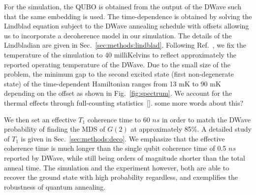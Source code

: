 \documentclass[prd,twocolumn,tightenlines,preprintnumbers,showpacs,superscriptaddress,notitlepage,nofootinbib,eqsecnum,floatfix,longbibliography]{revtex4}
\begin{document}
For the simulation, the QUBO is obtained from the output of the DWave such that the same embedding is used. The time-dependence is obtained by solving the Lindblad equation subject to the DWave annealing schedule with offsets allowing us to incorporate a decoherence model in our simulation. The details of the Lindbladian are given in Sec.~\ref{sec:methods:lindblad}. Following Ref.~\cite{}, we fix the temperature of the simulation to 40 milliKelvins to reflect approximately the reported operating temperature of the DWave. Due to the small size of the problem, the minimum gap to the second excited state (first non-degenerate state) of the time-dependent Hamiltonian ranges from 13 mK to 90 mK depending on the offset as shown in Fig.~\ref{fig:spectrum}. We account for the thermal effects through full-counting statistics~\ref{}. {\color{red}some more words about this?}

We then set an effective $T_1$ coherence time to 60 $ns$ in order to match the DWave probability of finding the MDS of $G(2)$ at approximately 85\%. A detailed study of $T_1$ is given in Sec.~\ref{sec:methods:deco}. We emphasize that the effective coherence time is much longer than the single qubit coherence time of 0.5 $ns$ reported by DWave, while still being orders of magnitude shorter than the total anneal time. The simulation and the experiment however, both are able to recover the ground state with high probability regardless, and exemplifies the robustness of quantum annealing.
\end{document}
